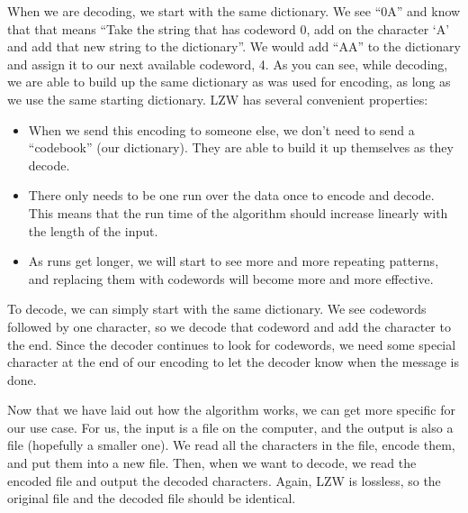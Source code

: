 \documentclass[12pt,twoside]{reedthesis}
\providecommand{\tightlist}{%
  \setlength{\itemsep}{0pt}\setlength{\parskip}{0pt}}
\begin{document}
When we are decoding, we start with the same dictionary. We see ``0A'' and know that that means ``Take the string that has codeword 0, add on the character `A' and add that new string to the dictionary''. We would add ``AA'' to the dictionary and assign it to our next available codeword, 4. As you can see, while decoding, we are able to build up the same dictionary as was used for encoding, as long as we use the same starting dictionary.
LZW has several convenient properties:
\begin{itemize}
\tightlist
\item
  When we send this encoding to someone else, we don't need to send a ``codebook'' (our dictionary). They are able to build it up themselves as they decode.
\item
  There only needs to be one run over the data once to encode and decode. This means that the run time of the algorithm should increase linearly with the length of the input.
\item
  As runs get longer, we will start to see more and more repeating patterns, and replacing them with codewords will become more and more effective.
\end{itemize}
To decode, we can simply start with the same dictionary. We see codewords followed by one character, so we decode that codeword and add the character to the end. Since the decoder continues to look for codewords, we need some special character at the end of our encoding to let the decoder know when the message is done.

Now that we have laid out how the algorithm works, we can get more specific for our use case. For us, the input is a file on the computer, and the output is also a file (hopefully a smaller one). We read all the characters in the file, encode them, and put them into a new file. Then, when we want to decode, we read the encoded file and output the decoded characters. Again, LZW is lossless, so the original file and the decoded file should be identical.
\end{document}
